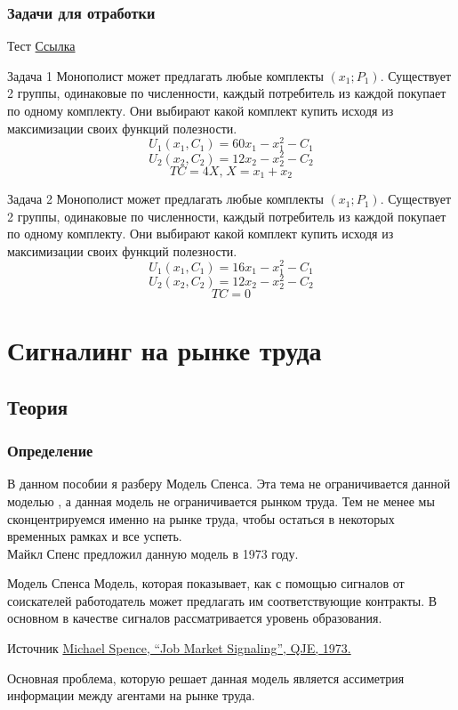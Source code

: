 \subsection{Задачи для отработки}
\begin{mybox}{Тест}
    \href{https://forms.gle/Ka76oAsLQDdQsKNR9}{Ссылка}
\end{mybox}

\begin{mybox}{Задача 1}
Монополист может предлагать любые комплекты $(x_1;P_1)$. Существует 2 группы, одинаковые по численности, каждый потребитель из каждой покупает по одному комплекту. Они выбирают какой комплект купить исходя из максимизации своих функций полезности. \\
$$U_1(x_1,C_1)=60x_1-x_1^2-C_1$$
$$U_2(x_2,C_2)=12x_2-x_2^2-C_2$$
$$TC=4X\text{,}\;X=x_1+x_2$$
\end{mybox}

\begin{mybox}{Задача 2}
Монополист может предлагать любые комплекты $(x_1;P_1)$. Существует 2 группы, одинаковые по численности, каждый потребитель из каждой покупает по одному комплекту. Они выбирают какой комплект купить исходя из максимизации своих функций полезности. \\
$$U_1(x_1,C_1)=16x_1-x_1^2-C_1$$
$$U_2(x_2,C_2)=12x_2-x_2^2-C_2$$
$$TC=0$$
\end{mybox}

\newpage
\chapter{Сигналинг на рынке труда}
\section{Теория}
\subsection{Определение}
\indent\setlength{\parindent}{1em}В данном пособии я разберу Модель Спенса. Эта тема не ограничивается данной моделью
, а данная модель не ограничивается рынком труда. Тем не менее мы сконцентрируемся именно на рынке труда, чтобы
остаться в некоторых временных рамках и все успеть. \smallskip\\
\indent\setlength{\parindent}{1em}Майкл Спенс предложил данную модель в 1973 году.
\
\begin{mybox}{Модель Спенса}
Модель, которая показывает, как с помощью сигналов от соискателей работодатель может предлагать им соответствующие
контракты. В основном в качестве сигналов рассматривается уровень образования.
\end{mybox}
\begin{mybox}{Источник}
    \href{https://www.sfu.ca/~allen/Spence.pdf}{Michael Spence, “Job Market Signaling”, QJE, 1973.}
\end{mybox}
\indent\setlength{\parindent}{1em}Основная проблема, которую решает данная модель является ассиметрия информации между агентами на рынке труда.

